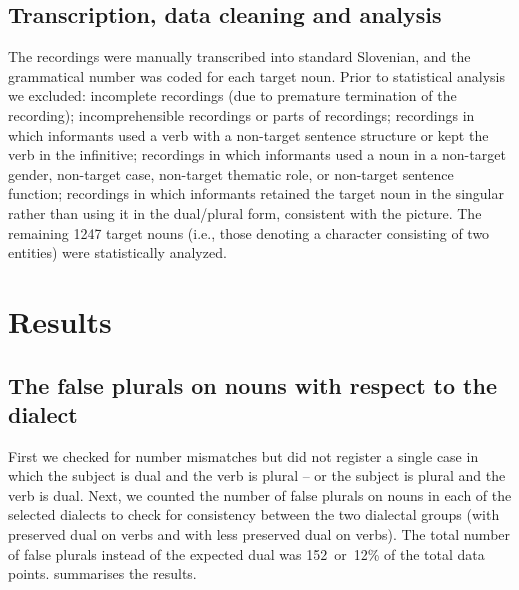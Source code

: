 \documentclass[output=paper,colorlinks,citecolor=brown]{langscibook}
\begin{document}
\subsection{Transcription, data cleaning and analysis}\label{pav:sec:transcription}
The recordings were manually transcribed into standard Slovenian, and the grammatical number was coded for each target noun. Prior to statistical analysis we excluded: incomplete recordings (due to premature termination of the recording); incomprehensible recordings or parts of recordings; recordings in which informants used a verb with a non-target sentence structure or kept the verb in the infinitive; recordings in which informants used a noun in a non-target gender, non-target case, non-target thematic role, or non-target sentence function; recordings in which informants retained the target noun in the singular rather than using it in the dual/plural form, consistent with the picture. The remaining 1247 target nouns (i.e., those denoting a character consisting of two entities) were statistically analyzed.

\section{Results}\label{pav:sec:results}
\subsection{The false plurals on nouns with respect to the dialect}\label{pav:sec:false-plurals}
First we checked for number mismatches but did not register a single case in which the subject is dual and the verb is plural -- or the subject is plural and the verb is dual. Next, we counted the number of false plurals on nouns in each of the selected dialects to check for consistency between the two dialectal groups (with preserved dual on verbs and with less preserved dual on verbs). The total number of false plurals instead of the expected dual was 152~or~12\% of the total data points.  summarises the results. 
\end{document}
